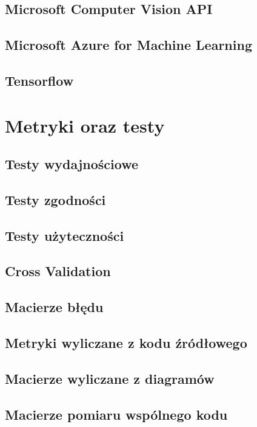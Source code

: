 \documentclass[brudnopis]{xmgr}
\begin{document}
\section{Microsoft Computer Vision API}

\section{Microsoft Azure for Machine Learning}

\section{Tensorflow}

\chapter{Metryki oraz testy}

\section{Testy wydajnościowe}

\section{Testy zgodności}

\section{Testy użyteczności}

\section{Cross Validation}

\section{Macierze błędu}

\section{Metryki wyliczane z kodu źródłowego}

\section{Macierze wyliczane z diagramów}

\section{Macierze pomiaru wspólnego kodu}
\end{document}
